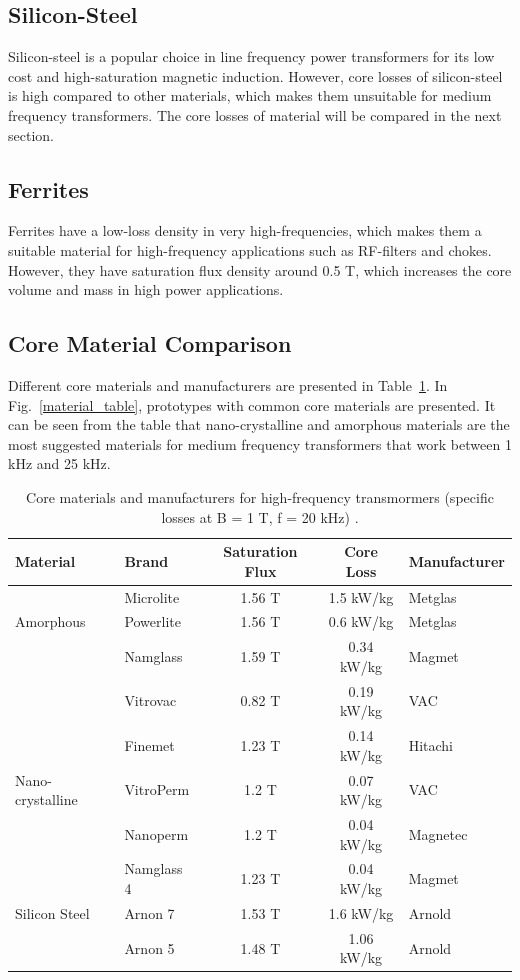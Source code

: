 \documentclass[a4paper, 11pt]{article} %
\begin{document}
\subsection*{Silicon-Steel}

Silicon-steel is a popular choice in line frequency power transformers for its low cost and high-saturation magnetic induction. However, core losses of silicon-steel is high compared to other materials, which makes them unsuitable for medium frequency transformers. The core losses of material will be compared in the next section.

\subsection*{Ferrites}

Ferrites have a low-loss density in very high-frequencies, which makes them a suitable material for high-frequency applications such as RF-filters and chokes. However, they have saturation flux density around 0.5 T, which increases the core volume and mass in high power applications. 

\subsection*{Core Material Comparison}

Different core materials and manufacturers are presented in Table~\ref{core-loss-table}. In Fig.~\ref{material_table}, prototypes with common core materials are presented. It can be seen from the table that nano-crystalline and amorphous materials are the most suggested materials for medium frequency transformers that work between 1 kHz and 25 kHz.

\begin{table}[]
\begin{center}
\begin{tabular}{llccl}
 Material & Brand & Saturation Flux & Core Loss & Manufacturer \\ 
 \hline
& Microlite & 1.56 T & 1.5 kW/kg & Metglas\\
Amorphous & Powerlite & 1.56 T & 0.6 kW/kg & Metglas\\
& Namglass & 1.59 T & 0.34 kW/kg & Magmet\\
& Vitrovac & 0.82 T & 0.19 kW/kg & VAC\\
\hline
& Finemet & 1.23 T & 0.14 kW/kg & Hitachi\\
Nano-crystalline& VitroPerm & 1.2 T & 0.07 kW/kg & VAC\\
& Nanoperm & 1.2 T & 0.04 kW/kg & Magnetec\\
& Namglass 4 & 1.23 T & 0.04 kW/kg & Magmet\\
\hline
Silicon Steel & Arnon 7 & 1.53 T & 1.6 kW/kg & Arnold\\
& Arnon 5 & 1.48 T & 1.06 kW/kg & Arnold\\
\hline
\end{tabular} 
\end{center}
\caption{Core materials and manufacturers for high-frequency transmormers (specific losses at B = 1 T, f = 20 kHz) \cite{Ortiz2010}.}
\label{core-loss-table}
\end{table}
\end{document}
